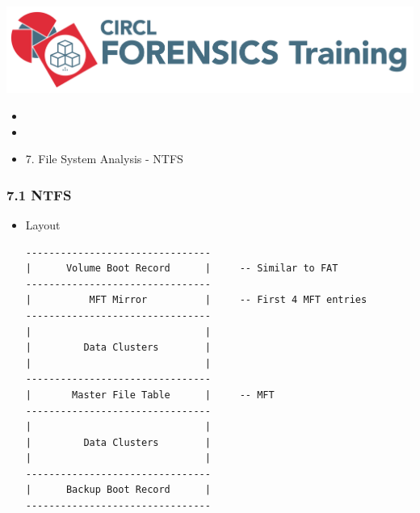 

\begin{frame}
    \includegraphics[scale=0.3]{images/logo-circl-Forensics.png}
    \begin{itemize}
        \item[]
        \item[]
        \item[] 7. File System Analysis - NTFS
    \end{itemize}
\end{frame}


\begin{frame}[fragile]
  \frametitle{7.1 NTFS}
    \begin{itemize}
	    \item Layout
  \begin{lstlisting}[basicstyle=\tiny]
--------------------------------
|      Volume Boot Record      |     -- Similar to FAT
--------------------------------
|          MFT Mirror          |     -- First 4 MFT entries
--------------------------------
|                              |
|         Data Clusters        |
|                              |
--------------------------------
|       Master File Table      |     -- MFT
--------------------------------
|                              |
|         Data Clusters        |
|                              |
--------------------------------
|      Backup Boot Record      |
--------------------------------
  \end{lstlisting}
    \end{itemize}
\end{frame}


